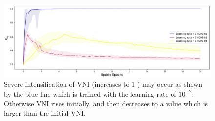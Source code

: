 \begin{figure}
\centering

\newcommand{\myWidth}{0.95\linewidth}
\includegraphics[width=\myWidth]{"dynamics_e20"}
\caption{
Severe intensification of VNI (increases to 1 ) may occur as shown by the blue line which is trained with the learning rate of $10^{-2} $. Otherwise VNI rises initially, and then decreases to a value which is larger than the initial VNI.
}
\label{fig:sec5_sim1}
\end{figure}
